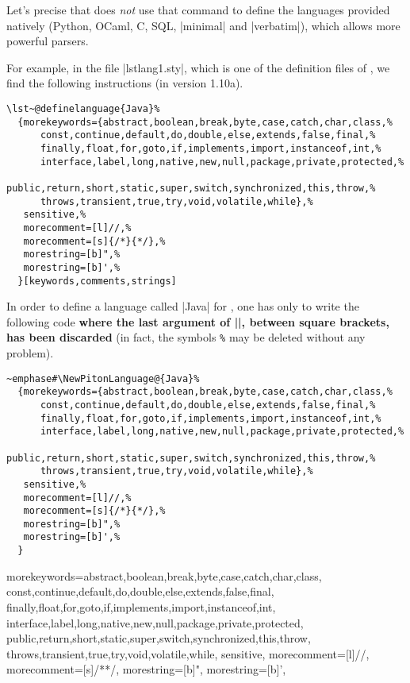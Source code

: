 \documentclass{article}
\begin{document}
Let's precise that  does \emph{not} use that command to define the
languages provided natively (Python, OCaml, C, SQL, |minimal| and |verbatim|),
which allows more powerful parsers.

\medskip
For example, in the file |lstlang1.sty|, which is one of the definition files
of , we find the following instructions (in version 1.10a).

\begin{small}
\begin{Verbatim}
\lst~@definelanguage{Java}%
  {morekeywords={abstract,boolean,break,byte,case,catch,char,class,%
      const,continue,default,do,double,else,extends,false,final,%
      finally,float,for,goto,if,implements,import,instanceof,int,%
      interface,label,long,native,new,null,package,private,protected,%
      public,return,short,static,super,switch,synchronized,this,throw,%
      throws,transient,true,try,void,volatile,while},%
   sensitive,%
   morecomment=[l]//,%
   morecomment=[s]{/*}{*/},%
   morestring=[b]",%
   morestring=[b]',%
  }[keywords,comments,strings]
\end{Verbatim}
\end{small}

\medskip
In order to define a language called |Java| for , one has only to
write the following code {\bfseries where the last argument of
|\lst@definelanguage|, between square brackets, has been discarded} (in fact,
the symbols \verb+%+ may be deleted without any problem).

\begin{small}
\begin{Verbatim}
~emphase#\NewPitonLanguage@{Java}%
  {morekeywords={abstract,boolean,break,byte,case,catch,char,class,%
      const,continue,default,do,double,else,extends,false,final,%
      finally,float,for,goto,if,implements,import,instanceof,int,%
      interface,label,long,native,new,null,package,private,protected,%
      public,return,short,static,super,switch,synchronized,this,throw,%
      throws,transient,true,try,void,volatile,while},%
   sensitive,%
   morecomment=[l]//,%
   morecomment=[s]{/*}{*/},%
   morestring=[b]",%
   morestring=[b]',%
  }
\end{Verbatim}
\end{small}


  {morekeywords={abstract,boolean,break,byte,case,catch,char,class,
      const,continue,default,do,double,else,extends,false,final,
      finally,float,for,goto,if,implements,import,instanceof,int,
      interface,label,long,native,new,null,package,private,protected,
      public,return,short,static,super,switch,synchronized,this,throw,
      throws,transient,true,try,void,volatile,while},
   sensitive,
   morecomment=[l]//,
   morecomment=[s]{/*}{*/},
   morestring=[b]",
   morestring=[b]',
  }
\end{document}
